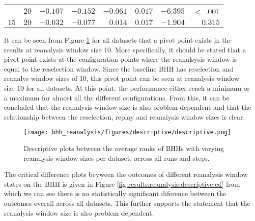 \begin{table}[htbp]
{\begin{tabular}{lrrrrrrr}
			$ $                  & $20$                 & $-0.107$             & $-0.152$                                        & $-0.061$             & $0.017$              & $-6.395$             & $<$ .001    \\
			$15$                 & $20$                 & $-0.032$             & $-0.077$                                        & $0.014$              & $0.017$              & $-1.904$             & $0.315$     \\
			\bottomrule
		\end{tabular}
	}
\end{table}

It can be seen from Figure \ref{fig:results:reanalysis:descriptive:descriptive} for all datasets that a pivot point exists in the results at reanalysis window size 10. More specifically, it should be stated that a pivot point exists at the configuration points where the reanalsysis window is equal to the reselection window. Since the baseline \Ac{BHH} has reselection and reanalys window sizes of 10, this pivot point can be seen at reanalysis window size 10 for all datasets. At this point, the performance either reach a minimum or a maximum for almost all the different configurations. From this, it can be concluded that the reanalysis window size is also problem dependent and that the relationship between the reselection, replay and reanalysis window sizes is clear.

\begin{figure}[htbp]
	\centering
	\texttt{[image: bhh\_reanalysis/figures/descriptive/descriptive.png]}
	\caption{Descriptive plots between the average ranks of \Acsp{BHH} with varying reanalysis window sizes per dataset, across all runs and steps.}
	\label{fig:results:reanalysis:descriptive:descriptive}
\end{figure}

The critical difference plots beyween the outcomes of different reanalysis window states on the \Ac{BHH} is given in Figure \ref{fig:results:reanalysis:descriptive:cd} from which we can see there is no statistically significant diference between the outcomes overall across all datasets. This further supports the statement that the reanalysis window size is also problem dependent.


